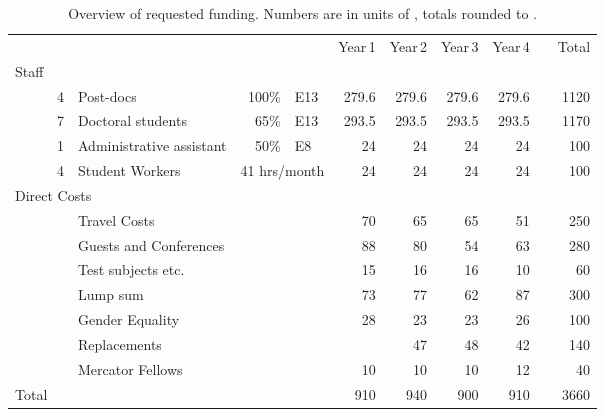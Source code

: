 

\begin{table*}\centering
\begin{tabular}{@{}rrlrlrrrrcr}\toprule
  &&&&& Year\,1 & Year\,2 & Year\,3 & Year\,4 && Total \\
\cmidrule{6-9}
\multicolumn{5}{l}{Staff} \\
~~~~& 4 & Post-docs &100\% & E13 & 279.6 & 279.6 & 279.6 & 279.6 &&
   1120 \\
& 7 & Doctoral students & 65\% & E13 &  293.5 & 293.5 & 293.5 & 293.5 &&
   1170\\
& 1 & Administrative assistant &  50\% & E8 &  24 & 24 & 24 & 24 &&
   100\\
& 4 & Student Workers & \multicolumn{2}{l}{41 hrs/month} &  24 & 24 & 24 & 24 &&
   100\\
\multicolumn{5}{l}{Direct Costs} \\
&& \multicolumn{2}{l}{Travel Costs} && 70 & 65 & 65 & 51 && 
   250 \\
&& \multicolumn{2}{l}{Guests and Conferences} && 88 & 80 & 54 & 63 && 
   280\\
&& \multicolumn{2}{l}{Test subjects etc.} && 15 & 16 & 16 & 10 && 
   60\\
&& \multicolumn{2}{l}{Lump sum} && 73 & 77 & 62 & 87 && 
   300\\
&& \multicolumn{2}{l}{Gender Equality} && 28 & 23 & 23 & 26 && 
   100\\
&& \multicolumn{2}{l}{Replacements} &&  & 47 & 48 & 42 && 
   140\\
&& \multicolumn{2}{l}{Mercator Fellows} && 10 & 10 & 10 & 12 && 
   40\\
\cmidrule{6-9}\cmidrule{11-11}
\multicolumn{3}{l}{Total} & & & 910 & 940 & 900 & 910 & & 3660 \\
\bottomrule
\end{tabular}
\caption{Overview of requested funding. Numbers are in units of , totals rounded to .}
\label{tab:reqfund}
\end{table*}
